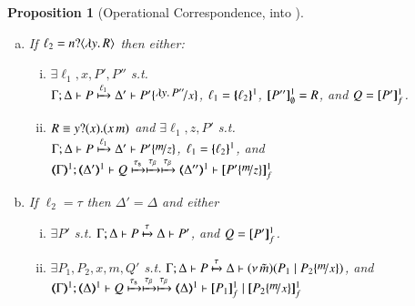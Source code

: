 \documentclass[preprint,11pt]{elsarticle}
\newtheorem{proposition}{Proposition}[section]
\begin{document}
{{\begin{proposition}[Operational Correspondence, \HOp into \HO]
\begin{enumerate}[1.]
\begin{enumerate}[a)]
				\item 
					If $\ell_2 = n ? \langle \lambda y.\,R \rangle$ %
					then either:
%
					\begin{enumerate}[(i)]
						\item	$\exists \ell_1, x, P', P''$ s.t. \\
							$\horel{\Gamma}{\Delta}{P}{\hby{\ell_1}}{\Delta'}{P' \subst{\abs{y}P''}{x}}$, 
							$\ell_1 = \{\!\!\{\ell_2\}\!\!\}^{1}$, $[\!\![P'']\!\!]^1_\emptyset = R$, and $Q = [\!\![P']\!\!]^1_f$.

						\item	$R \equiv y ? (x) . (x\, {m})$ and 
							$\exists \ell_1, z, P'$ s.t. \\
							$\horel{\Gamma}{\Delta}{P}{\hby{\ell_1}}{\Delta'}{P' \subst{m}{z}}$, 
							$\ell_1 = \{\!\!\{\ell_2\}\!\!\}^{1}$,
							and\\
							$\horel{\tmap{\Gamma}{1}}{\tmap{\Delta'}{1}}{Q}{\hby{\stau} \hby{\btau} \hby{\btau}}{\tmap{\Delta''}{1}}{\pmapp{P'\subst{m}{z}}{1}{f}}$
					\end{enumerate}
			
				\item 
					If $\ell_2 = \tau$ 
					then $\Delta' = \Delta$ and 
					either
%
					\begin{enumerate}[(i)]
						\item	$\exists P'$ s.t. 
							$\Gamma; \Delta \vdash P \xmapsto{\tau} \Delta \vdash P'$,
							and $Q = [\!\![P']\!\!]^{1}_f$.	

						\item
							$\exists P_1, P_2, x, m, Q'$ s.t. 
							$\horel{\Gamma}{\Delta}{P}{\hby{\tau}}{\Delta}{\newsp{\tilde{m}}{P_1 \Par P_2\subst{m}{x}} }$, and\\
							$\horel{\tmap{\Gamma}{1}}{\tmap{\Delta}{1}}{Q}{\hby{\stau} \hby{\btau} \hby{\btau}}{\tmap{\Delta}{1}}{\pmapp{P_1}{1}{f} \Par \pmapp{P_2\subst{m}{x}}{1}{f}}$ 

			\end{enumerate}
		    \end{enumerate}
		    
	\end{enumerate}
\end{proposition}


}}
\end{document}
